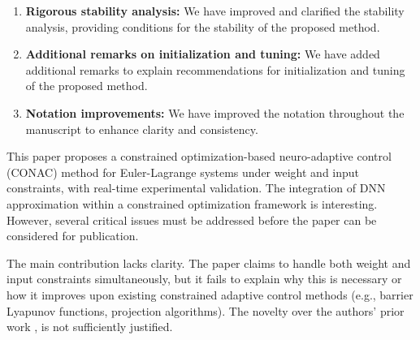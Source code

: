 \documentclass[12pt,english]{reviewresponse}
\begin{document}
\begin{revresponse}[]
\begin{enumerate}
    \item \textbf{Rigorous stability analysis:} 
      We have improved and clarified the stability analysis, providing conditions for the stability of the proposed method.

    \item \textbf{Additional remarks on initialization and tuning:} 
      We have added additional remarks to explain recommendations for initialization and tuning of the proposed method.

    \item \textbf{Notation improvements:} 
      We have improved the notation throughout the manuscript to enhance clarity and consistency.

  \end{enumerate}

\end{revresponse}

\reviewer
\begin{generalcomment}
	This paper proposes a constrained optimization-based neuro-adaptive control (CONAC) method for Euler-Lagrange systems under weight and input constraints, with real-time experimental validation. The integration of DNN approximation within a constrained optimization framework is interesting. However, several critical issues must be addressed before the paper can be considered for publication.
\end{generalcomment}

% 
\begin{revcomment}[1][1]{}
	The main contribution lacks clarity. The paper claims to handle both weight and input constraints simultaneously, but it fails to explain why this is necessary or how it improves upon existing constrained adaptive control methods (e.g., barrier Lyapunov functions, projection algorithms). The novelty over the authors’ prior work \cite{Ryu:2025aa}, \cite{Ryu:2025ab} is not sufficiently justified.
\end{revcomment}
\end{document}
